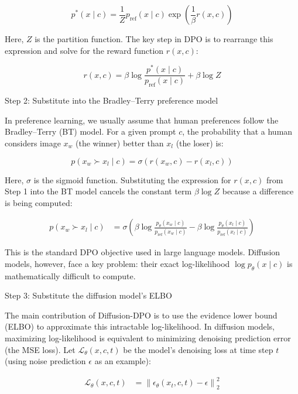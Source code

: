 \[
p^{*}(x\mid c)=\frac{1}{Z}p_{\mathrm{ref}}(x\mid c)\exp\left(\frac{1}{\beta}r(x,c)\right)
\]

Here, \(Z\) is the partition function. The key step in DPO is to rearrange this expression and solve for the reward function \(r(x,c)\):

\[
r(x,c)=\beta\log\frac{p^{*}(x\mid c)}{p_{\mathrm{ref}}(x\mid c)}+\beta\log Z
\]

Step 2: Substitute into the Bradley--Terry preference model

In preference learning, we usually assume that human preferences follow the Bradley--Terry (BT) model. For a given prompt \(c\), the probability that a human considers image \(x_w\) (the winner) better than \(x_l\) (the loser) is:

\[
p(x_w\succ x_l\mid c)=\sigma\left(r(x_w,c)-r(x_l,c)\right)
\]

Here, \(\sigma\) is the sigmoid function. Substituting the expression for \(r(x,c)\) from Step 1 into the BT model cancels the constant term \(\beta\log Z\) because a difference is being computed:

\[
\begin{aligned}
p(x_w\succ x_l\mid c)
&=\sigma\left(
\beta\log\frac{p_\theta(x_w\mid c)}{p_{\mathrm{ref}}(x_w\mid c)}
-\beta\log\frac{p_\theta(x_l\mid c)}{p_{\mathrm{ref}}(x_l\mid c)}
\right)
\end{aligned}
\]

This is the standard DPO objective used in large language models. Diffusion models, however, face a key problem: their exact log-likelihood \(\log p_\theta(x\mid c)\) is mathematically difficult to compute.

Step 3: Substitute the diffusion model's ELBO

The main contribution of Diffusion-DPO is to use the evidence lower bound (ELBO) to approximate this intractable log-likelihood. In diffusion models, maximizing log-likelihood is equivalent to minimizing denoising prediction error (the MSE loss). Let \(\mathcal{L}_\theta(x,c,t)\) be the model's denoising loss at time step \(t\) (using noise prediction \(\epsilon\) as an example):

\[
\begin{aligned}
\mathcal{L}_\theta(x,c,t)
&=\left\lVert \epsilon_\theta(x_t,c,t)-\epsilon\right\rVert_2^2
\end{aligned}
\]

